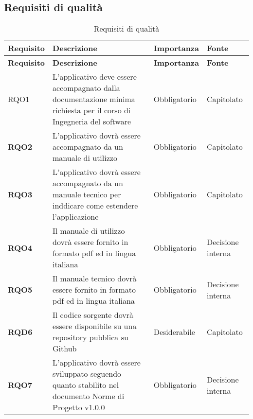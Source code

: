 \subsection{Requisiti di qualità}
\label{sub:requisiti_di_qualita}

\renewcommand{\arraystretch}{2} %
\begin{longtable}[H]{>{\centering\bfseries}m{2cm} >{\centering}m{9cm} >{\centering}m{2.5cm} >{\centering\arraybackslash}m{2.5cm}}
    \caption{Requisiti di qualità}%
    \label{tab:requisiti_di_qualita} \\
    \rowcolor{lightgray}
    {\textbf{Requisito}} & {\textbf{Descrizione}} & {\textbf{Importanza}} & {\textbf{Fonte}}  \\
    \endfirsthead%
    \rowcolor{lightgray}
    {\textbf{Requisito}} & {\textbf{Descrizione}} & {\textbf{Importanza}} & {\textbf{Fonte}}  \\
    \endhead%
    \rowcolor{white}
    \multicolumn{4}{c}{\textit{Continua alla pagina successiva}}
    \endfoot%
    \endlastfoot%

    RQO1
        & L'applicativo deve essere accompagnato dalla documentazione minima richiesta per il corso di Ingegneria del software
        & Obbligatorio
        & Capitolato \\

    RQO2
        & L'applicativo dovrà essere accompagnato da un manuale di utilizzo
        & Obbligatorio
        & Capitolato \\

    RQO3
        & L'applicativo dovrà essere accompagnato da un manuale tecnico per inddicare come estendere l'applicazione
        & Obbligatorio
        & Capitolato \\

    RQO4
        & Il manuale di utilizzo dovrà essere fornito in formato pdf ed in lingua italiana
        & Obbligatorio
        & Decisione interna \\

    RQO5
        & Il manuale tecnico dovrà essere fornito in formato pdf ed in lingua italiana
        & Obbligatorio
        & Decisione interna \\

    RQD6
        & Il codice sorgente dovrà essere disponibile su una repository pubblica su Github
        & Desiderabile
        & Capitolato \\

    RQO7
        & L'applicativo dovrà essere sviluppato seguendo quanto stabilito nel documento Norme di Progetto v1.0.0
        & Obbligatorio
        & Decisione interna

\end{longtable}
